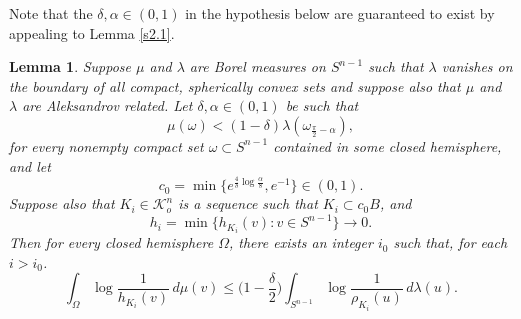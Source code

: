 \documentclass{cpamart1}     %
\newtheorem{lemm}[theo]{Lemma}
\theoremstyle{definition}
\theoremstyle{remark}
\newcommand{\sn}{S^{n-1}}
\begin{document}
Note that the $\delta, \alpha \in(0,1)$ in the hypothesis below are guaranteed to exist
 by appealing to Lemma \ref{s2.1}.
\begin{lemm}\label{e4}
Suppose $\mu$ and $\lambda$ are Borel measures on $\sn$
such that
$\lambda$ vanishes on the boundary of all compact, spherically convex sets
and suppose also that
$\mu$ and $\lambda$ are Aleksandrov related. Let $\delta, \alpha \in(0,1)$ be
such that
\begin{equation*}
\mu(\omega)<(1-\delta) \lambda(\omega_{\frac\pi2-\alpha}),
\end{equation*}
for every nonempty compact set $\omega\subset S^{n-1}$ contained in some closed hemisphere,
and let
\begin{equation}\label{c0}
c_0=\min\{e^{\frac{4}{\delta}\log\frac{\alpha}{8}}, e^{-1}\}\in (0,1).
\end{equation}
Suppose also that $K_i\in \mathcal{K}_o^n$
is a sequence such that $K_i\subset c_0B$, and
\[
h_i=\min\{h_{K_i}(v):v\in S^{n-1}\}\rightarrow 0.
\]
Then for every closed hemisphere $\Omega$, there exists an integer $i_0$ such that, for each $i>i_0$.
\begin{equation*}
\int_{\Omega}\log{ \frac1{h_{K_i}(v)} } \, d\mu(v) \leq
\big(1-{\textstyle\frac\delta 2}\big)\int_{S^{n-1}}\log{ \frac1{\rho_{K_i}(u)} }\,d\lambda(u).
\end{equation*}
\end{lemm}
\end{document}

